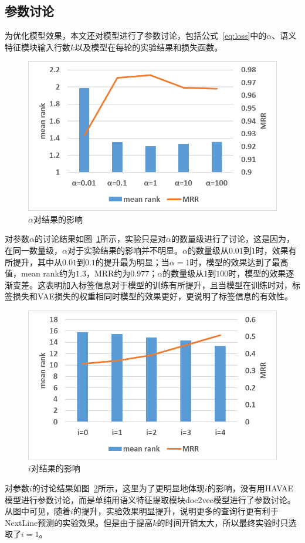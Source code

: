 \subsection{参数讨论}
为优化模型效果，本文还对模型进行了参数讨论，包括公式~\ref{eq:loss}中的$\alpha$、语义特征模块输入行数$k$以及模型在每轮的实验结果和损失函数。\par

\begin{figure}[h]
    \centering
    \includegraphics[width=12cm]{alpha.png}
    \caption{$\alpha$对结果的影响}
    \label{fig:alpha}
\end{figure}
对参数$\alpha$的讨论结果如图~\ref{fig:alpha}所示，实验只是对$\alpha$的数量级进行了讨论，这是因为，在同一数量级，$\alpha$对于实验结果的影响并不明显。$\alpha$的数量级从$0.01$到$1$时，效果有所提升，其中从$0.01$到$0.1$的提升最为明显；当$\alpha = 1$时，模型的效果达到了最高值，mean rank约为$1.3$，MRR约为$0.977$；$\alpha$的数量级从$1$到$100$时，模型的效果逐渐变差。这表明加入标签信息对于模型的训练有所提升，且当模型在训练时对，标签损失和VAE损失的权重相同时模型的效果更好，更说明了标签信息的有效性。\par

\begin{figure}[h]
    \centering
    \includegraphics[width=12cm]{k.png}
    \caption{$i$对结果的影响}
    \label{fig:k}
\end{figure}
对参数$i$的讨论结果如图~\ref{fig:k}所示，这里为了更明显地体现$i$的影响，没有用HAVAE模型进行参数讨论，而是单纯用语义特征提取模块doc2vec模型进行了参数讨论。从图中可见，随着$i$的提升，实验效果明显提升，说明更多的查询行更有利于NextLine预测的实验效果。但是由于提高$k$的时间开销太大，所以最终实验时只选取了$i=1$。\par

